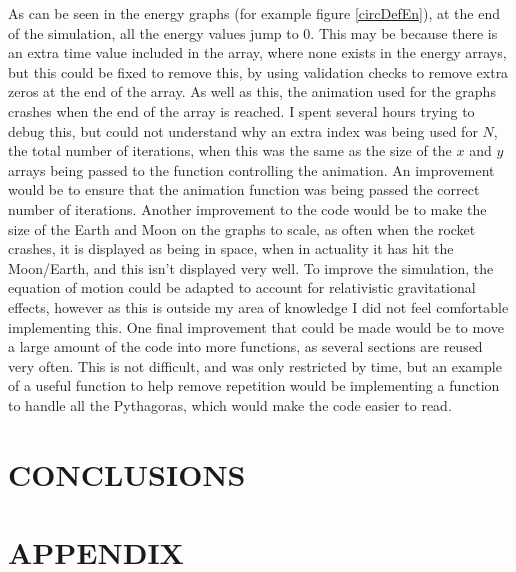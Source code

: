 \documentclass[twocolumn,prl,nobalancelastpage,aps,10pt]{revtex4-1}
\begin{document}
As can be seen in the energy graphs (for example figure \ref{circDefEn}), at the end of the simulation, all the energy values jump to 0. This may be because there is an extra time value included in the array, where none exists in the energy arrays, but this could be fixed to remove this, by using validation checks to remove extra zeros at the end of the array. As well as this, the animation used for the graphs crashes when the end of the array is reached. I spent several hours trying to debug this, but could not understand why an extra index was being used for $N$, the total number of iterations, when this was the same as the size of the $x$ and $y$ arrays being passed to the function controlling the animation. An improvement would be to ensure that the animation function was being passed the correct number of iterations. Another improvement to the code would be to make the size of the Earth and Moon on the graphs to scale, as often when the rocket crashes, it is displayed as being in space, when in actuality it has hit the Moon/Earth, and this isn't displayed very well. To improve the simulation, the equation of motion could be adapted to account for relativistic gravitational effects, however as this is outside my area of knowledge I did not feel comfortable implementing this. One final improvement that could be made would be to move a large amount of the code into more functions, as several sections are reused very often. This is not difficult, and was only restricted by time, but an example of a useful function to help remove repetition would be implementing a function to handle all the Pythagoras, which would make the code easier to read.


\section{CONCLUSIONS}


\section{APPENDIX}

%
\end{document}
